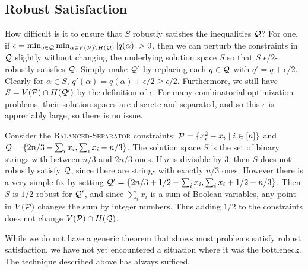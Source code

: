 \subsection{Robust Satisfaction}
How difficult is it to ensure that $S$ robustly satisfies the inequalities $\mathcal Q$? For one, if $\epsilon = \min_{q \in \mathcal Q} \min_{\alpha \in V(\mathcal P) \setminus H(\mathcal Q)} |q(\alpha)| > 0$, then we can perturb the constraints in $\mathcal Q$ slightly without changing the underlying solution space $S$ so that $S$ $\epsilon/2$-robustly satisfies $\mathcal Q$. Simply make $\mathcal Q'$ by replacing each $q \in \mathcal Q$ with $q' = q + \epsilon/2$. Clearly for $\alpha \in S$, $q'(\alpha) = q(\alpha) + \epsilon/2 \geq \epsilon/2$. Furthermore, we still have $S = V(\mathcal P) \cap H(\mathcal Q')$ by the definition of $\epsilon$. For many combinatorial optimization problems, their solution spaces are discrete and separated, and so this $\epsilon$ is appreciably large, so there is no issue. 
\begin{example}
Consider the \textsc{Balanced-Separator} constraints: $\mathcal P = \{x_i^2 - x_i \mid i \in [n]\}$ and $\mathcal Q = \{2n/3 - \sum_i x_i, \sum_i x_i - n/3\}$. The solution space $S$ is the set of binary strings with between $n/3$ and $2n/3$ ones. If $n$ is divisible by $3$, then $S$ does not robustly satisfy $\mathcal Q$, since there are strings with exactly $n/3$ ones. However there is a very simple fix by setting $\mathcal Q' = \{2n/3 + 1/2 - \sum_i x_i, \sum_i x_i + 1/2 - n/3\}$. Then $S$ is $1/2$-robust for $\mathcal Q'$, and since $\sum_i x_i$ is a sum of Boolean variables, any point in $V(\mathcal P)$ changes the sum by integer numbers. Thus adding $1/2$ to the constraints does not change $V(\mathcal P) \cap H(\mathcal Q)$.
\end{example}
While we do not have a generic theorem that shows most problems satisfy robust satisfaction, we have not yet encountered a situation where it was the bottleneck. The technique described above has always sufficed.

